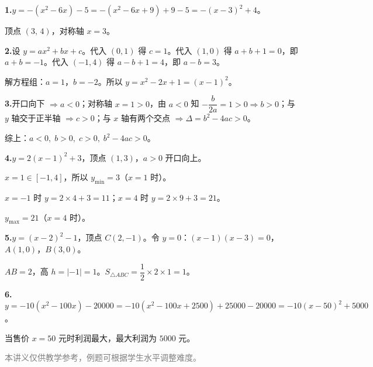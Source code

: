 \documentclass[12pt, a4paper]{ctexart}
\begin{document}
\vspace{6pt}
\begin{knowledgebox}[参考答案]
\textbf{1.}\quad $y = -(x^2-6x) - 5 = -(x^2-6x+9) + 9 - 5 = -(x-3)^2 + 4$。

顶点 $(3,\,4)$，对称轴 $x=3$。

\medskip
\textbf{2.}\quad 设 $y=ax^2+bx+c$。代入 $(0,1)$ 得 $c=1$。代入 $(1,0)$ 得 $a+b+1=0$，即 $a+b=-1$。代入 $(-1,4)$ 得 $a-b+1=4$，即 $a-b=3$。

解方程组：$a=1$，$b=-2$。所以 $\boxed{y = x^2 - 2x + 1 = (x-1)^2}$。

\medskip
\textbf{3.}\quad 开口向下 $\Rightarrow a<0$；对称轴 $x=1>0$，由 $a<0$ 知 $-\dfrac{b}{2a}=1>0 \Rightarrow b>0$；与 $y$ 轴交于正半轴 $\Rightarrow c>0$；与 $x$ 轴有两个交点 $\Rightarrow \Delta = b^2-4ac > 0$。

综上：$a<0,\; b>0,\; c>0,\; b^2-4ac>0$。

\medskip
\textbf{4.}\quad $y=2(x-1)^2+3$，顶点 $(1,3)$，$a>0$ 开口向上。

$x=1 \in [-1,4]$，所以 $y_{\min}=3$（$x=1$ 时）。

$x=-1$ 时 $y=2\times4+3=11$；$x=4$ 时 $y=2\times9+3=21$。

$y_{\max}=21$（$x=4$ 时）。

\medskip
\textbf{5.}\quad $y=(x-2)^2-1$，顶点 $C(2,-1)$。令 $y=0$：$(x-1)(x-3)=0$，$A(1,0)$，$B(3,0)$。

$AB=2$，高 $h=|-1|=1$。$S_{\triangle ABC}=\dfrac{1}{2}\times 2\times 1 = \boxed{1}$。

\medskip
\textbf{6.}\quad $y=-10(x^2-100x)-20000 = -10(x^2-100x+2500)+25000-20000 = -10(x-50)^2+5000$。

当售价 $x=50$ 元时利润最大，最大利润为 $5000$ 元。
\end{knowledgebox}

\vfill
\begin{center}
\small\textcolor{gray}{本讲义仅供教学参考，例题可根据学生水平调整难度。}
\end{center}
\end{document}
